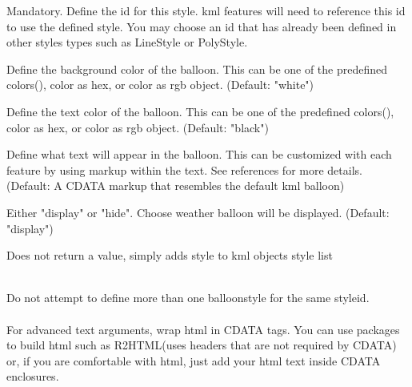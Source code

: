 \documentclass[a4paper]{book}
\begin{document}
\begin{Arguments}
\begin{ldescription}
\item[\code{styleid}] 
Mandatory. Define the id for this style. kml features will need to reference this id to use the defined style. You may choose an id that has already been defined in other styles types such as LineStyle or PolyStyle.

\item[\code{bgColor}] 
Define the background color of the balloon. This can be one of the predefined colors(), color as hex, or color as rgb object. (Default: "white")

\item[\code{textColor}] 
Define the text color of the balloon. This can be one of the predefined colors(), color as hex, or color as rgb object. (Default: "black")

\item[\code{text}] 
Define what text will appear in the balloon. This can be customized with each feature by using markup within the text. See references for more details. (Default: A CDATA markup that resembles the default kml balloon)

\item[\code{displayMode}] 
Either "display" or "hide". Choose weather balloon will be displayed. (Default: "display")

\end{ldescription}
\end{Arguments}
%
\begin{Value}
Does not return a value, simply adds style to kml objects style list
\end{Value}
%
\begin{Note}\relax
{}\\{}
Do not attempt to define more than one balloonstyle for the same styleid.
\\{}
\\{}
For advanced text arguments, wrap html in CDATA tags. You can use packages to build html such as R2HTML(uses headers that are not required by CDATA) or, if you are comfortable with html, just add your html text inside CDATA enclosures.\\{}
\code{text = ''<![CDATA[}\\{}
\\{}
\\{}
\\{}
\code{]]>''}


\end{Note}
\end{document}
